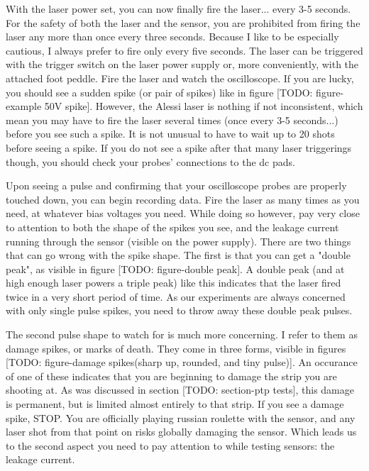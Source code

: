 \documentclass{report}
\begin{document}
            With the laser power set, you can now finally fire the laser... every 3-5 seconds. For the safety of both the laser and the sensor, you are prohibited from firing the laser any more than once every three seconds. Because I like to be especially cautious, I always prefer to fire only every five seconds. The laser can be triggered with the trigger switch on the laser power supply or, more conveniently, with the attached foot peddle. Fire the laser and watch the oscilloscope. If you are lucky, you should see a sudden spike (or pair of spikes) like in figure [TODO: figure-example 50V spike]. However, the Alessi laser is nothing if not inconsistent, which mean you may have to fire the laser several times (once every 3-5 seconds...) before you see such a spike. It is not unusual to have to wait up to 20 shots before seeing a spike. If you do not see a spike after that many laser triggerings though, you should check your probes' connections to the dc pads.

            Upon seeing a pulse and confirming that your oscilloscope probes are properly touched down, you can begin recording data. Fire the laser as many times as you need, at whatever bias voltages you need. While doing so however, pay very close to attention to both the shape of the spikes you see, and the leakage current running through the sensor (visible on the power supply). There are two things that can go wrong with the spike shape. The first is that you can get a "double peak", as visible in figure [TODO: figure-double peak]. A double peak (and at high enough laser powers a triple peak) like this indicates that the laser fired twice in a very short period of time. As our experiments are always concerned with only single pulse spikes, you need to throw away these double peak pulses. 
            
            The second pulse shape to watch for is much more concerning. I refer to them as damage spikes, or marks of death. They come in three forms, visible in figures [TODO: figure-damage spikes(sharp up, rounded, and tiny pulse)]. An occurance of one of these indicates that you are beginning to damage the strip you are shooting at. As was discussed in section [TODO: section-ptp tests], this damage is permanent, but is limited almost entirely to that strip. If you see a damage spike, STOP. You are officially playing russian roulette with the sensor, and any laser shot from that point on risks globally damaging the sensor. Which leads us to the second aspect you need to pay attention to while testing sensors: the leakage current.
\end{document}
